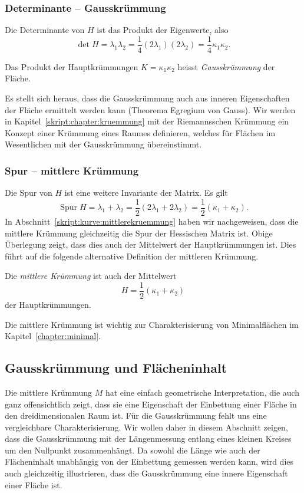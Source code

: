 \subsubsection{Determinante -- Gausskrümmung}
Die Determinante von $H$ ist das Produkt der Eigenwerte, also
\[
\det H
=
\lambda_1\lambda_2
=
\frac14 (2\lambda_1) (2\lambda_2)
=
\frac14 \kappa_1\kappa_2.
\]
\begin{definition}
\label{skript:definition:gausskruemmung}
Das Produkt der Hauptkrümmungen $K=\kappa_1\kappa_2$
heisst {\em Gausskrümmung} der Fläche.
\end{definition}
Es stellt sich heraus, dass die Gausskrümmung auch aus inneren Eigenschaften
der Fläche ermittelt werden kann
(Theorema Egregium von Gauss).
Wir werden in Kapitel~\ref{skript:chapter:kruemmung} 
mit der Riemannsschen Krümmung ein Konzept einer Krümmung eines Raumes
definieren, welches für Flächen im Wesentlichen mit der Gausskrümmung
übereinstimmt.

\subsubsection{Spur -- mittlere Krümmung}
Die Spur von $H$ ist eine weitere Invariante der Matrix.
Es gilt
\[
\operatorname{Spur} H
=
\lambda_1+\lambda_2
=
\frac12(2\lambda_1+2\lambda_2)
=
\frac12(\kappa_1+\kappa_2).
\]
In Abschnitt~\ref{skript:kurve:mittlerekruemmung} haben wir nachgeweisen,
dass die mittlere Krümmung gleichzeitig die Spur der Hessischen Matrix ist.
Obige Überlegung zeigt, dass dies auch der Mittelwert der Hauptkrümmungen ist.
Dies führt auf die folgende alternative Definition der mittleren Krümmung.

\begin{definition}
\label{skript:definition:mittlerekruemmung2}
Die {\em mittlere Krümmung} ist auch der Mittelwert
\[
H=\frac12(\kappa_1+\kappa_2)
\]
der Hauptkrümmungen.
\end{definition}
Die mittlere Krümmung ist wichtig zur Charakterisierung von Minimalflächen
im Kapitel~\ref{chapter:minimal}.

\subsection{Gausskrümmung und Flächeninhalt}
Die mittlere Krümmung $M$ hat eine einfach geometrische Interpretation,
die auch ganz offensichtlich zeigt, dass sie eine Eigenschaft der Einbettung
einer Fläche in den dreidimensionalen Raum ist.
Für die Gausskrümmung fehlt uns eine vergleichbare Charakterisierung.
Wir wollen daher in diesem Abschnitt zeigen, dass die Gausskrümmung
mit der Längenmessung entlang eines kleinen Kreises um den Nullpunkt
zusammenhängt.
Da sowohl die Länge wie auch der Flächeninhalt unabhängig von der
Einbettung gemessen werden kann,
wird dies auch gleichzeitig illustrieren, dass die Gausskrümmung eine
innere Eigenschaft einer Fläche ist.

